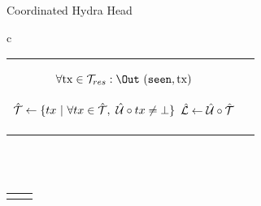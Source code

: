 \begin{figure*}[t!]
\begin{algobox}{Coordinated Hydra Head}
\begin{tabular}{c}
\begin{tabular}{c@{}c}
{\begin{walgo}{0.65}
{{{                $\forall \tx \in \mT_{res}: \Out~(\hpSeen,\tx)$ \; %

                \textcolor{blue}{
                  $\hat {\mathcal T} \gets \{ tx ~ | ~ \forall tx \in \hat {\mathcal T}, ~ \hat {\mathcal U} \circ tx \not = \bot \}$ \; %
                  $\hat {\mathcal L} \gets \hat {\mathcal U}\circ\hat {\mathcal T}$
                }
              }
            }
           }
          
        \end{walgo}
        }
        &

        \adjustbox{valign=t,scale=\sfact}{
        \begin{walgo}{0.6}
          \On{$(\hpAS,s,\msSig_j)$ from $\party_j$}{ %

            \textcolor{red}\Req{} $s \in \{\hats,\hats+1\}$
            \; %

            \Wait{$\hats=s$
            }{ %
            
            \textcolor{red}\Req{} $(j, \cdot) \notin \hatSigma$ \; %

            $\hatSigma \gets \hatSigma \cup (j,\msSig_j)$ \; %

            \If{$\forall k \in [1..n]: (k,\cdot) \in \hatSigma$}{ %
              $\msCSig \gets \msComb(\hydraKeys, \hatSigma)$ \; %

              $\eta' \gets (\hats, \combine(\hatmU))$ \; %
              \Req{} $\msVfy(\hydraKeysAgg, (\cid || \eta_{0} || \eta'), \msCSig)$ \;
              $\barmU \gets \hatmU$ \; %
              $\bars \gets \hats$ \; %
              $\barsigma \gets \msCSig$ \; %

              $\forall \tx \in \mT_{res} : \Out (\hpConf,\tx)$ \; %

              \If{$\hats = \bars \land \hpLdr(\bars + 1) = i$}{%
                \Multi{} $(\hpRS,\bars+1,\hatmT^{\downarrow1})$ \;%
              }
            }
          } }
        \end{walgo}

          }

      \end{tabular}

      \\
      \\

      \begin{tabular}{c c}
        \adjustbox{valign=t,scale=\sfact}{
        \begin{walgo}{0.6}


\end{walgo}}
\end{tabular}
\end{tabular}
\end{algobox}
\end{figure*}
